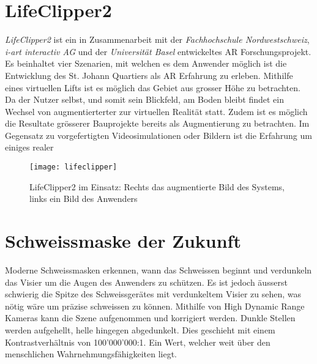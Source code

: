 \section{LifeClipper2}\label{s.clipper}
\textit{LifeClipper2} ist ein in Zusammenarbeit mit der \textit{Fachhochschule Nordwestschweiz}, \textit{i-art interactiv AG} und der \textit{Universität Basel} entwickeltes AR Forschungsprojekt. Es beinhaltet vier Szenarien, mit welchen es dem Anwender möglich ist die Entwicklung des St. Johann Quartiers als AR Erfahrung zu erleben. Mithilfe eines virtuellen Lifts ist es möglich das Gebiet aus grosser Höhe zu betrachten. Da der Nutzer selbst, und somit sein Blickfeld, am Boden bleibt findet ein Wechsel von augmentierterter zur virtuellen Realität statt. Zudem ist es möglich die Resultate grösserer Bauprojekte bereits als Augmentierung zu betrachten. Im Gegensatz zu vorgefertigten Videosimulationen oder Bildern ist die Erfahrung um einiges realer \cite[S.~172~ff.]{website:lifeclipper}\\[6pt]

\begin{figure}[ht]
	\vspace{-15pt}
	\begin{center}
		\texttt{[image: lifeclipper]}
	\end{center}
	\vspace{-15pt}
	\caption[LifeClipper2 im Einsatz]{LifeClipper2 im Einsatz: Rechts das augmentierte Bild des Systems, links ein Bild des Anwenders}\label{lifeclipper}
	\vspace{-10pt}
\end{figure}


\section{Schweissmaske der Zukunft}\label{s.welding}
Moderne Schweissmasken erkennen, wann das Schweissen beginnt und verdunkeln das Visier um die Augen des Anwenders zu schützen. Es ist jedoch äusserst schwierig die Spitze des Schweissgerätes mit verdunkeltem Visier zu sehen, was nötig wäre um präzise schweissen zu können. Mithilfe von High Dynamic Range Kameras kann die Szene aufgenommen und korrigiert werden. Dunkle Stellen werden aufgehellt, helle hingegen abgedunkelt. Dies geschieht mit einem Kontrastverhältnis von 100'000'000:1. Ein Wert, welcher weit über den menschlichen Wahrnehmungsfähigkeiten liegt.\\[6pt]

